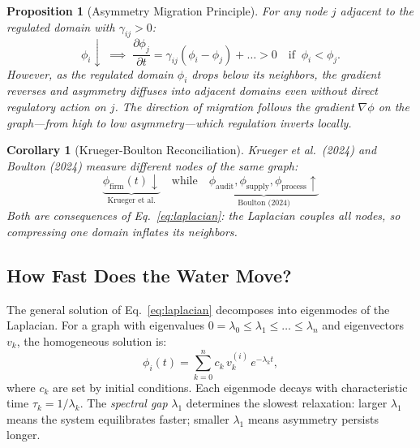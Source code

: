 \documentclass[12pt,a4paper]{article}
\newtheorem{proposition}{Proposition}
\newtheorem{corollary}{Corollary}
\begin{document}
\begin{proposition}[Asymmetry Migration Principle]
\label{prop:migration}
For any node $j$ adjacent to the regulated domain with $\gamma_{ij} > 0$:
\begin{equation}
\phi_i \downarrow \;\implies\; \frac{\partial \phi_j}{\partial t} = \gamma_{ij}(\phi_i - \phi_j) + \ldots > 0 \quad \text{if}\;\; \phi_i < \phi_j.
\end{equation}
However, as the regulated domain $\phi_i$ drops below its neighbors, the gradient reverses and asymmetry diffuses \textit{into} adjacent domains even without direct regulatory action on $j$. The direction of migration follows the gradient $\nabla\phi$ on the graph---from high to low asymmetry---which regulation inverts locally.
\end{proposition}

\begin{corollary}[Krueger-Boulton Reconciliation]
Krueger et al.\ (2024) and Boulton (2024) measure different nodes of the same graph:
\begin{equation}
\underbrace{\phi_{\text{firm}}(t) \downarrow}_{\text{Krueger et al.}} \quad \text{while} \quad \underbrace{\phi_{\text{audit}}, \phi_{\text{supply}}, \phi_{\text{process}} \uparrow}_{\text{Boulton (2024)}}
\end{equation}
Both are consequences of Eq.~\eqref{eq:laplacian}: the Laplacian couples all nodes, so compressing one domain inflates its neighbors.
\end{corollary}

\subsection{How Fast Does the Water Move?}

The general solution of Eq.~\eqref{eq:laplacian} decomposes into eigenmodes of the Laplacian. For a graph with eigenvalues $0 = \lambda_0 \leq \lambda_1 \leq \ldots \leq \lambda_n$ and eigenvectors $v_k$, the homogeneous solution is:
\begin{equation}
\phi_i(t) = \sum_{k=0}^{n} c_k \, v_k^{(i)} \, e^{-\lambda_k t},
\label{eq:eigenmodes}
\end{equation}
where $c_k$ are set by initial conditions. Each eigenmode decays with characteristic time $\tau_k = 1/\lambda_k$. The \textit{spectral gap} $\lambda_1$ determines the slowest relaxation: larger $\lambda_1$ means the system equilibrates faster; smaller $\lambda_1$ means asymmetry persists longer.
\end{document}
